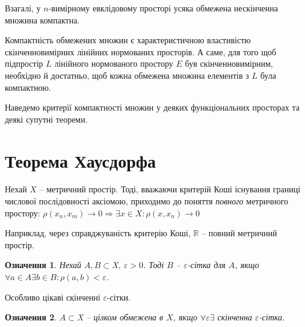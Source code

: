 \documentclass[14pt,twoside]{extreport}
\theoremstyle{mystyle}
\newtheorem{dfn}{Означення}
\numberwithin{equation}{chapter}
\begin{document}
Взагалі, у $n$-вимірному евклідовому просторі усяка обмежена нескінченна множина компактна.

Компактність обмежених множин є характеристичною властивістю скінченновимірних лінійних нормованих просторів. А саме, для того щоб підпростір $L$ лінійного нормованого простору $E$ був скінченновимірним, необхідно й достатньо, щоб кожна обмежена множина елементів з $L$ була компактною.

Наведемо критерії компактності множин у деяких функціональних просторах та деякі супутні теореми.

\section{Теорема Хаусдорфа}

Нехай $X$ -- метричний простір. Тоді, вважаючи критерій Коші існування границі числової послідовності аксіомою, приходимо до поняття \emph{повного} метричного простору:
$\rho(x_n, x_m) \to 0 \Rightarrow \exists x \in X:  \rho(x, x_n) \to 0 $

Наприклад, через справджуваність критерію Коші, $\mathbb{R}$ -- повний метричний простір.

\begin{dfn} Нехай $A, B \subset $X$ $, $\varepsilon > 0 $. Тоді $B $ -- $\varepsilon$-сітка для $A$, якщо $\forall a\in A \exists b \in B:  \rho(a, b) < \varepsilon$.
\end{dfn}

Особливо цікаві скінченні $\varepsilon$-сітки.

\begin{dfn}	$A \subset $X$ $ -- цілком обмежена в $X$, якщо $\forall \varepsilon  \exists $ скінченна $\varepsilon$-сітка.
\end{dfn}
\end{document}
